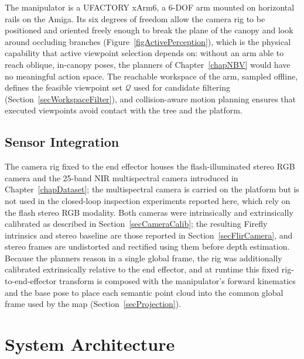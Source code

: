 The manipulator is a UFACTORY xArm6, a 6-DOF arm mounted on horizontal rails
on the Amiga. Its six degrees of freedom allow the camera rig to be
positioned and oriented freely enough to break the plane of the canopy and
look around occluding branches (Figure~\ref{figActivePerception}), which is
the physical capability that active viewpoint selection depends on: without
an arm able to reach oblique, in-canopy poses, the planners of
Chapter~\ref{chapNBV} would have no meaningful action space. The reachable workspace of the arm, sampled
offline, defines the feasible viewpoint set $\mathcal{Q}$ used for candidate
filtering (Section~\ref{secWorkspaceFilter}), and collision-aware motion
planning ensures that executed viewpoints avoid contact with the tree and
the platform.

\subsection{Sensor Integration} \label{secSensorCalib}

The camera rig fixed to the end effector houses the flash-illuminated stereo
RGB camera and the 25-band NIR multispectral camera introduced in
Chapter~\ref{chapDataset}; the multispectral camera is carried on the
platform but is not used in the closed-loop inspection experiments reported
here, which rely on the flash stereo RGB modality. Both cameras were
intrinsically and extrinsically calibrated as described in
Section~\ref{secCameraCalib}; the resulting Firefly intrinsics and stereo
baseline are those reported in Section~\ref{secFlirCamera}, and stereo
frames are undistorted and rectified using them before depth estimation.
Because the planners reason in a single global frame, the rig was
additionally calibrated extrinsically relative to the end effector, and at
runtime this fixed rig-to-end-effector transform is composed with the
manipulator's forward kinematics and the base pose to place each semantic
point cloud into the common global frame used by the map
(Section~\ref{secProjection}).

\section{System Architecture} \label{secSystemArch}

